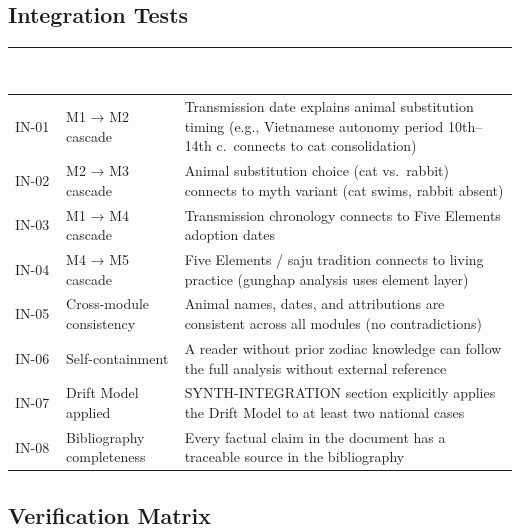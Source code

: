 \documentclass[11pt,letterpaper]{article}
\newcommand{\tableheader}[1]{\textbf{\sffamily\textcolor{white}{#1}}}
\begin{document}
\subsection{Integration Tests}

\begin{center}
\begin{tabularx}{\textwidth}{C{1.5cm}L{3.5cm}X}
\toprule
{}
\tableheader{Test ID} & \tableheader{Verifies} & \tableheader{Expected Behavior} \\
\midrule
IN-01 & M1 → M2 cascade & Transmission date explains animal substitution timing (e.g., Vietnamese autonomy period 10th--14th c.\ connects to cat consolidation) \\
IN-02 & M2 → M3 cascade & Animal substitution choice (cat vs.\ rabbit) connects to myth variant (cat swims, rabbit absent) \\
IN-03 & M1 → M4 cascade & Transmission chronology connects to Five Elements adoption dates \\
IN-04 & M4 → M5 cascade & Five Elements / saju tradition connects to living practice (gunghap analysis uses element layer) \\
IN-05 & Cross-module consistency & Animal names, dates, and attributions are consistent across all modules (no contradictions) \\
IN-06 & Self-containment & A reader without prior zodiac knowledge can follow the full analysis without external reference \\
IN-07 & Drift Model applied & SYNTH-INTEGRATION section explicitly applies the Drift Model to at least two national cases \\
IN-08 & Bibliography completeness & Every factual claim in the document has a traceable source in the bibliography \\
\bottomrule
\end{tabularx}
\end{center}

\subsection{Verification Matrix}
\end{document}
